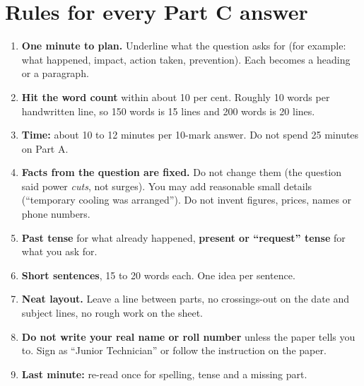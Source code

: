 \documentclass[11pt,a4paper]{article}
\begin{document}
\section{Rules for every Part C answer}
\begin{enumerate}
\item \textbf{One minute to plan.} Underline what the question asks for (for example: what happened, impact, action taken, prevention). Each becomes a heading or a paragraph.
\item \textbf{Hit the word count} within about 10 per cent. Roughly 10 words per handwritten line, so 150 words is 15 lines and 200 words is 20 lines.
\item \textbf{Time:} about 10 to 12 minutes per 10-mark answer. Do not spend 25 minutes on Part A.
\item \textbf{Facts from the question are fixed.} Do not change them (the question said power \emph{cuts}, not surges). You may add reasonable small details (``temporary cooling was arranged''). Do not invent figures, prices, names or phone numbers.
\item \textbf{Past tense} for what already happened, \textbf{present or ``request'' tense} for what you ask for.
\item \textbf{Short sentences}, 15 to 20 words each. One idea per sentence.
\item \textbf{Neat layout.} Leave a line between parts, no crossings-out on the date and subject lines, no rough work on the sheet.
\item \textbf{Do not write your real name or roll number} unless the paper tells you to. Sign as ``Junior Technician'' or follow the instruction on the paper.
\item \textbf{Last minute:} re-read once for spelling, tense and a missing part.
\end{enumerate}
\end{document}
